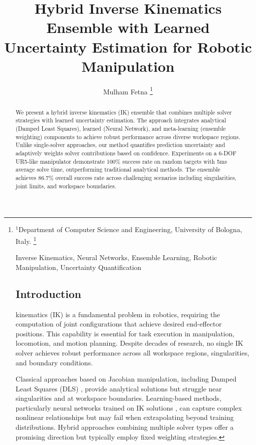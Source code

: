 \title{Hybrid Inverse Kinematics Ensemble with Learned Uncertainty Estimation for Robotic Manipulation}

\author{Mulham Fetna%
\thanks{$^{1}$Department of Computer Science and Engineering, University of Bologna, Italy. 
\thanks{$^{2}$Department of Computer Science, University of Tuscia, Italy.
\thanks{Correspondence: mulham.fetna@studio.unibo.it}}


\begin{abstract}
We present a hybrid inverse kinematics (IK) ensemble that combines multiple solver strategies with learned uncertainty estimation. The approach integrates analytical (Damped Least Squares), learned (Neural Network), and meta-learning (ensemble weighting) components to achieve robust performance across diverse workspace regions. Unlike single-solver approaches, our method quantifies prediction uncertainty and adaptively weights solver contributions based on confidence. Experiments on a 6-DOF UR5-like manipulator demonstrate 100\% success rate on random targets with 5ms average solve time, outperforming traditional analytical methods. The ensemble achieves 86.7\% overall success rate across challenging scenarios including singularities, joint limits, and workspace boundaries.
\end{abstract}

\begin{IEEEkeywords}
Inverse Kinematics, Neural Networks, Ensemble Learning, Robotic Manipulation, Uncertainty Quantification
\end{IEEEkeywords}

\section{Introduction}
 kinematics (IK) is a fundamental problem in robotics, requiring the computation of joint configurations that achieve desired end-effector positions. This capability is essential for task execution in manipulation, locomotion, and motion planning. Despite decades of research, no single IK solver achieves robust performance across all workspace regions, singularities, and boundary conditions.

Classical approaches based on Jacobian manipulation, including Damped Least Squares (DLS) \cite{buss2005selecting}, provide analytical solutions but struggle near singularities and at workspace boundaries. Learning-based methods, particularly neural networks trained on IK solutions \cite{duan2018one}, can capture complex nonlinear relationships but may fail when extrapolating beyond training distributions. Hybrid approaches combining multiple solver types offer a promising direction but typically employ fixed weighting strategies.

}}
